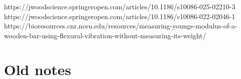 https://jwoodscience.springeropen.com/articles/10.1186/s10086-025-02210-3
https://jwoodscience.springeropen.com/articles/10.1186/s10086-022-02046-1
https://bioresources.cnr.ncsu.edu/resources/measuring-youngs-modulus-of-a-wooden-bar-using-flexural-vibration-without-measuring-its-weight/



\section{Old notes}





